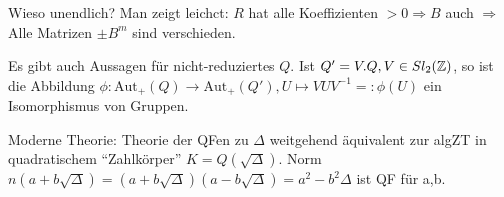 \documentclass[a4paper,twoside,DIV15,BCOR12mm]{scrbook}
\begin{document}
Wieso unendlich? Man zeigt leichct: $R$ hat alle Koeffizienten $> 0 \Rightarrow B$ auch $\Rightarrow$ Alle Matrizen $\pm B^m$ sind verschieden.

Es gibt auch Aussagen für nicht-reduziertes $Q$. Ist $Q' = V.Q, V \in Sl_2(\mathbb{Z})$, so ist die Abbildung $\phi: \text{Aut}_+(Q) \to \text{Aut}_+(Q'), U \mapsto VUV^{-1} =: \phi(U)$ ein Isomorphismus von Gruppen.

Moderne Theorie: Theorie der QFen zu $\Delta$ weitgehend äquivalent zur algZT in quadratischem "`Zahlkörper"' $K = Q(\sqrt{\Delta})$. Norm $n(a + b\sqrt{\Delta}) = (a + b\sqrt{\Delta})(a-b\sqrt{\Delta}) = a^2 - b^2 \Delta$ ist QF für a,b.
\end{document}

